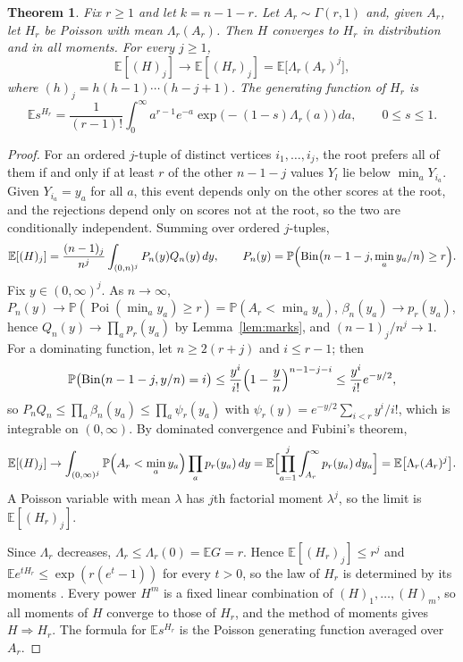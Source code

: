 \documentclass[11pt]{amsart}
\newtheorem{theorem}{Theorem}[section]
\theoremstyle{remark}
\numberwithin{equation}{section}
\newcommand{\E}{\mathbb E}
\newcommand{\Pp}{\mathbb P}
\newcommand{\1}{\mathbf 1}
\newcommand{\Bin}{\operatorname{Bin}}
\newcommand{\Poi}{\operatorname{Poi}}
\begin{document}
\begin{theorem}\label{thm:fixedr}
Fix $r\ge1$ and let $k=n-1-r$. Let $A_r\sim\Gamma(r,1)$ and, given $A_r$, let $H_r$ be Poisson with mean $\Lambda_r(A_r)$. Then $H$ converges to $H_r$ in distribution and in all moments. For every $j\ge1$,
\[
\E[(H)_j]\to\E[(H_r)_j]=\E\bigl[\Lambda_r(A_r)^j\bigr],
\]
where $(h)_j=h(h-1)\cdots(h-j+1)$. The generating function of $H_r$ is
\[
\E s^{H_r}=\frac1{(r-1)!}\int_0^\infty a^{r-1}e^{-a}\exp\bigl(-(1-s)\Lambda_r(a)\bigr)\,da,\qquad0\le s\le1.
\]
\end{theorem}

\begin{proof}
For an ordered $j$-tuple of distinct vertices $i_1,\dots,i_j$, the root prefers all of them if and only if at least $r$ of the other $n-1-j$ values $Y_l$ lie below $\min_aY_{i_a}$. Given $Y_{i_a}=y_a$ for all $a$, this event depends only on the other scores at the root, and the rejections depend only on scores not at the root, so the two are conditionally independent. Summing over ordered $j$-tuples,
\begin{equation}\label{eq:factmom}
\E[(H)_j]=\frac{(n-1)_j}{n^j}\int_{(0,n)^j}P_n(y)Q_n(y)\,dy,\qquad P_n(y)=\Pp\Bigl(\Bin\bigl(n-1-j,\min_ay_a/n\bigr)\ge r\Bigr).
\end{equation}
Fix $y\in(0,\infty)^j$. As $n\to\infty$, $P_n(y)\to\Pp(\Poi(\min_ay_a)\ge r)=\Pp(A_r<\min_ay_a)$, $\beta_n(y_a)\to p_r(y_a)$, hence $Q_n(y)\to\prod_ap_r(y_a)$ by Lemma~\ref{lem:marks}, and $(n-1)_j/n^j\to1$. For a dominating function, let $n\ge2(r+j)$ and $i\le r-1$; then
\[
\Pp\bigl(\Bin(n-1-j,y/n)=i\bigr)\le\frac{y^i}{i!}\Bigl(1-\frac yn\Bigr)^{n-1-j-i}\le\frac{y^i}{i!}e^{-y/2},
\]
so $P_nQ_n\le\prod_a\beta_n(y_a)\le\prod_a\psi_r(y_a)$ with $\psi_r(y)=e^{-y/2}\sum_{i<r}y^i/i!$, which is integrable on $(0,\infty)$. By dominated convergence and Fubini's theorem,
\[
\E[(H)_j]\to\int_{(0,\infty)^j}\Pp\Bigl(A_r<\min_ay_a\Bigr)\prod_ap_r(y_a)\,dy=\E\Bigl[\prod_{a=1}^j\int_{A_r}^\infty p_r(y_a)\,dy_a\Bigr]=\E\bigl[\Lambda_r(A_r)^j\bigr].
\]
A Poisson variable with mean $\lambda$ has $j$th factorial moment $\lambda^j$, so the limit is $\E[(H_r)_j]$.

Since $\Lambda_r$ decreases, $\Lambda_r\le\Lambda_r(0)=\E G=r$. Hence $\E[(H_r)_j]\le r^j$ and $\E e^{tH_r}\le\exp(r(e^t-1))$ for every $t>0$, so the law of $H_r$ is determined by its moments \cite[Theorem~30.1]{Bil}. Every power $H^m$ is a fixed linear combination of $(H)_1,\dots,(H)_m$, so all moments of $H$ converge to those of $H_r$, and the method of moments \cite[Theorem~30.2]{Bil} gives $H\Rightarrow H_r$. The formula for $\E s^{H_r}$ is the Poisson generating function averaged over $A_r$.
\end{proof}
\end{document}
